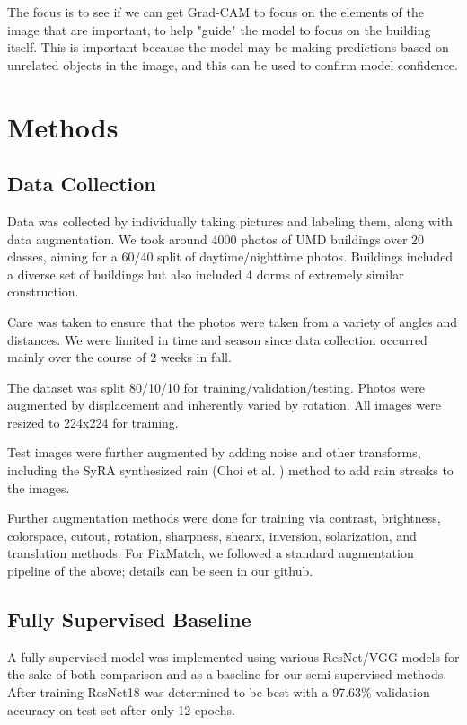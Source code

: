 \documentclass{article}
\begin{document}
The focus is to see if we can get Grad-CAM to focus on the elements of the image that are important, to help "guide" the model to focus on the building itself. This is important because the model may be making predictions based on unrelated objects in the image, and this can be used to confirm model confidence.

\section{Methods}
\label{method}

\subsection{Data Collection}

Data was collected by individually taking pictures and labeling them, along with data augmentation. We took around 4000 photos of UMD buildings over 20 classes, aiming for a 60/40 split of daytime/nighttime photos. Buildings included a diverse set of buildings but also included 4 dorms of extremely similar construction.

Care was taken to ensure that the photos were taken from a variety of angles and distances. We were limited in time and season since data collection occurred mainly over the course of 2 weeks in fall. 


The dataset was split 80/10/10 for training/validation/testing. Photos were augmented by displacement and inherently varied by rotation. All images were resized to 224x224 for training. 

Test images were further augmented by adding noise and other transforms, including the SyRA synthesized rain (Choi et al. \cite{choi}) method to add rain streaks to the images. 

Further augmentation methods were done for training via contrast, brightness, colorspace, cutout, rotation, sharpness, shearx, inversion, solarization, and translation methods. For FixMatch, we followed a standard augmentation pipeline of the above; details can be seen in our github.

\subsection{Fully Supervised Baseline}

A fully supervised model was implemented using various ResNet/VGG models for the sake of both comparison and as a baseline for our semi-supervised methods. After training ResNet18 was determined to be best with a 97.63\% validation accuracy on test set after only 12 epochs. 
\end{document}
